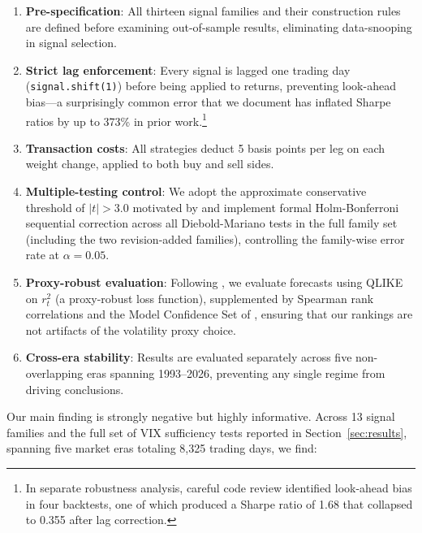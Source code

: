 \documentclass[12pt,a4paper]{article}
\begin{document}
\begin{enumerate}[label=(\roman*)]
    \item \textbf{Pre-specification}: All thirteen signal families and their construction rules are defined before examining out-of-sample results, eliminating data-snooping in signal selection.
    \item \textbf{Strict lag enforcement}: Every signal is lagged one trading day (\texttt{signal.shift(1)}) before being applied to returns, preventing look-ahead bias---a surprisingly common error that we document has inflated Sharpe ratios by up to 373\% in prior work.\footnote{In separate robustness analysis, careful code review identified look-ahead bias in four backtests, one of which produced a Sharpe ratio of 1.68 that collapsed to 0.355 after lag correction.}
    \item \textbf{Transaction costs}: All strategies deduct 5 basis points per leg on each weight change, applied to both buy and sell sides.
    \item \textbf{Multiple-testing control}: We adopt the approximate conservative threshold of $|t| > 3.0$ motivated by \citet{harvey2016} and implement formal Holm-Bonferroni sequential correction across all Diebold-Mariano tests in the full family set (including the two revision-added families), controlling the family-wise error rate at $\alpha = 0.05$.
    \item \textbf{Proxy-robust evaluation}: Following \citet{patton2011}, we evaluate forecasts using QLIKE on $r_t^2$ (a proxy-robust loss function), supplemented by Spearman rank correlations and the Model Confidence Set of \citet{hansen2011mcs}, ensuring that our rankings are not artifacts of the volatility proxy choice.
    \item \textbf{Cross-era stability}: Results are evaluated separately across five non-overlapping eras spanning 1993--2026, preventing any single regime from driving conclusions.
\end{enumerate}

Our main finding is strongly negative but highly informative. Across 13 signal families and the full set of VIX sufficiency tests reported in Section~\ref{sec:results}, spanning five market eras totaling 8,325 trading days, we find:
\end{document}
